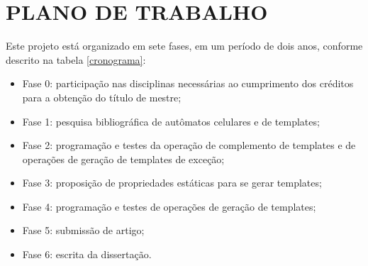 \section{PLANO DE TRABALHO}
\label{sec:planoDeTrabalho}

Este projeto está organizado em sete fases, em um período de dois anos, conforme descrito na tabela \ref{cronograma}:

  \begin{itemize}
      \item Fase 0: participação nas disciplinas necessárias ao cumprimento dos créditos para a obtenção do título de mestre;
      \item Fase 1: pesquisa bibliográfica de autômatos celulares e de templates;
      \item Fase 2: programação e testes da operação de complemento de templates e de operações de geração de templates de exceção;
      \item Fase 3: proposição de propriedades estáticas para se gerar templates;
      \item Fase 4: programação e testes de operações de geração de templates;
      \item Fase 5: submissão de artigo;
      \item Fase 6: escrita da dissertação.
  \end{itemize}

\begin{table}[h!]
\centering
\caption{Cronograma de desenvolvimento do projeto}
\label{cronograma}
\end{table}